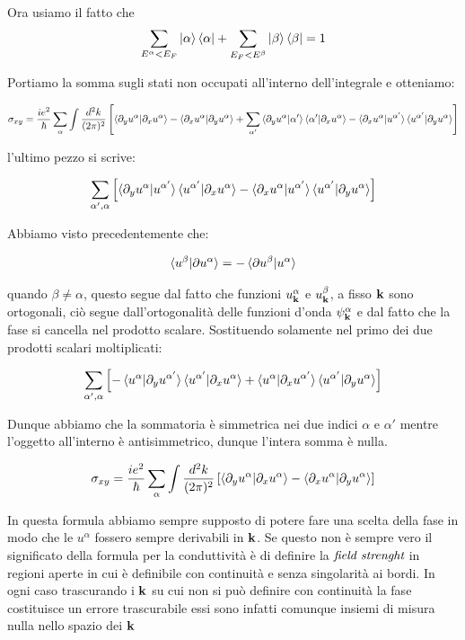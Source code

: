 \documentclass[12pt,a4paper]{article}
\begin{document}
Ora usiamo il fatto che $$\sum_{E^{\alpha} < E_F}  \ket{\alpha} \bra{\alpha} + \sum_{E_{F} < E^{\beta}} \ket{\beta}\bra{\beta} = 1$$ 

Portiamo la somma sugli stati non occupati all'interno dell'integrale e otteniamo:

\[
\sigma_{xy} = \frac{i e^2}{\hbar} \sum_{\alpha} \int \frac{d^2 k}{(2 \pi)^2} \left[\braket{\partial_y u^{\alpha} | \partial_x u^{\alpha}} - \braket{\partial_x u^{\alpha} | \partial_y u^{\alpha}} + \sum_{\alpha'} \braket{\partial_y u^{\alpha} | \alpha' } \braket{\alpha' | \partial_x u^{\alpha}} - \braket{\partial_x u^{\alpha} | u^{\alpha'}} \braket{u^{\alpha'} | \partial_y u^{\alpha}} \right]
\]

l'ultimo pezzo si scrive:

\[
\sum_{\alpha', \alpha} \left[ \braket{\partial_y u^{\alpha} | u^{\alpha'} } \braket{u^{\alpha'} | \partial_x u^{\alpha}} - \braket{\partial_x u^{\alpha} | u^{\alpha'}} \braket{u^{\alpha'} | \partial_y u^{\alpha}} \right]
\]

Abbiamo visto precedentemente che:

\[
\braket{u^{\beta}|\partial u^{\alpha}} = - \braket{\partial u^{\beta}| u^{\alpha}}
\]

quando $\beta \neq \alpha$, questo segue dal fatto che funzioni $u_{\bold{k}}^{\alpha}$ e $u_{\bold{k}}^{\beta}$, a fisso $\bold{k}$ sono ortogonali, ciò segue dall'ortogonalità delle funzioni d'onda $\psi_{\bold{k}}^{\alpha}$ e dal fatto che la fase si cancella nel prodotto scalare. Sostituendo solamente nel primo dei due prodotti scalari moltiplicati:

\[
\sum_{\alpha', \alpha} \left[ - \braket{u^{\alpha} | \partial_y u^{\alpha'} } \braket{u^{\alpha'} |\partial_x  u^{\alpha}} + \braket{u^{\alpha} |\partial_x u^{\alpha'}} \braket{u^{\alpha'} | \partial_y u^{\alpha}} \right]
\]

Dunque abbiamo che la sommatoria è simmetrica nei due indici $\alpha$ e $\alpha'$ mentre l'oggetto all'interno è antisimmetrico, dunque l'intera somma è nulla.

\begin{equation}
\sigma_{xy} = \frac{i e^2}{\hbar} \sum_{\alpha} \int \frac{d^2 k}{(2 \pi)^2} \left[\braket{\partial_y u^{\alpha} | \partial_x u^{\alpha}} - \braket{\partial_x u^{\alpha} | \partial_y u^{\alpha}}\right]
\end{equation}

In questa formula abbiamo sempre supposto di potere fare una scelta della fase in modo che le $u^{\alpha}$ fossero sempre derivabili in $\bold{k}$. Se questo non è sempre vero il significato della formula per la conduttività è di definire la $\emph{field strenght}$ in regioni aperte in cui è definibile con continuità e senza singolarità ai bordi.
In ogni caso trascurando i $\bold{k}$ su cui non si può definire con continuità la fase costituisce un errore trascurabile essi sono infatti comunque insiemi di misura nulla nello spazio dei $\bold{k}$
\end{document}
